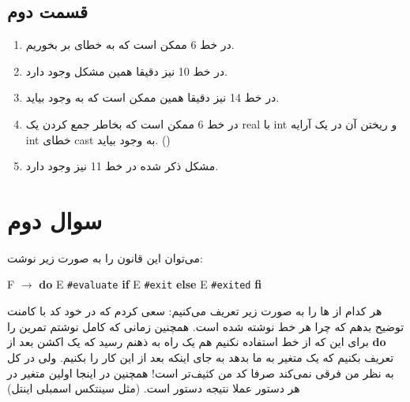\documentclass[]{article}
\begin{document}
\subsection*{قسمت دوم}
\begin{enumerate}
    \item در خط 6 ممکن است که به خطای  بر بخوریم.
    \item در خط 10 نیز دقیقا همین مشکل وجود دارد.
    \item در خط 14 نیز دقیقا همین  ممکن است که به وجود بیاید.
    \item در خط 6 ممکن است که بخاطر جمع کردن یک real با int و ریختن آن در یک آرایه int خطای cast به وجود بیاید. ()
    \item مشکل ذکر شده در خط 11 نیز وجود دارد.
\end{enumerate}
\section*{سوال دوم}
می‌توان این قانون را به صورت زیر نوشت:
\begin{latin}
    \centering
    F $\rightarrow$ \textbf{do} E \texttt{\#evaluate} \textbf{if} E \texttt{\#exit} \textbf{else} E \texttt{\#exited} \textbf{fi}
\end{latin}
هر کدام از
ها
را به صورت زیر تعریف می‌کنیم:
سعی کردم که در خود کد با کامنت توضیح بدهم که چرا هر خط نوشته شده است. همچنین زمانی که کامل نوشتم
تمرین را برای این که از خط
استفاده نکنیم هم یک راه به ذهنم رسید که یک اکشن بعد از
\textbf{do}
تعریف بکنیم که یک متغیر
به ما بدهد به جای اینکه بعد از
این کار را بکنیم. ولی در کل به نظر من فرقی نمی‌کند صرفا کد من کثیف‌تر است! همچنین در اینجا اولین
متغیر در هر دستور عملا نتیجه دستور است. (مثل سینتکس اسمبلی اینتل)
\end{document}
